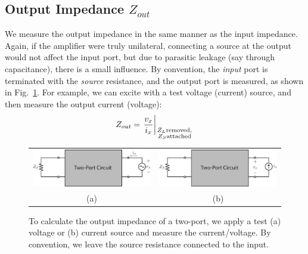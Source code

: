 \subsection{Output Impedance \texorpdfstring{$Z_{out}$}{}}
We measure the output impedance in the same manner as the input impedance.  Again, if the amplifier were truly unilateral, connecting a source at the output would not affect the input port, but due to parasitic leakage (say through capacitance), there is a small influence.  By convention, the \textit{input} port is terminated with the \textit{source} resistance, and the output port is measured, as shown in Fig.~\ref{fig:2port_zout_vx}.
For example, we can excite with a test voltage (current) source, and then measure the output current (voltage):
    \begin{equation}
        {Z_{out}} = {\left. \frac{v_x}{i_x}\right|_{\genfrac{}{}{0pt}{2}
            {\scriptstyle{Z_L}\text{removed},}
            {\scriptstyle{Z_S}\text{attached}}}}
    \end{equation}
\begin{figure}[tb]
\centering
\begin{tabular}{cc}
\includegraphics[width=.45\columnwidth]{2port_zout_vx} &
\includegraphics[width=.45\columnwidth]{2port_zout_ix}\\
(a) & (b)\\
\end{tabular}
\caption{To calculate the output impedance of a two-port, we apply a test (a) voltage or (b) current source and measure the current/voltage.  By convention, we leave the source resistance connected to the input.}
\label{fig:2port_zout_vx}
\end{figure}
